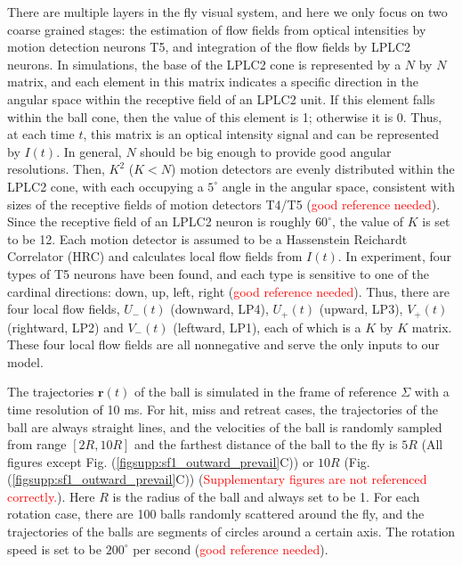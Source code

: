 There are multiple layers in the fly visual system, and here we only focus on two coarse grained stages: the estimation of flow fields from optical intensities by motion detection neurons T5, and integration of the flow fields by LPLC2 neurons. In simulations, the base of the LPLC2 cone is represented by a $N$ by $N$ matrix, and each element in this matrix indicates a specific direction in the angular space within the receptive field of an LPLC2 unit. If this element falls within the ball cone, then the value of this element is 1; otherwise it is 0. Thus, at each time $t$, this matrix is an optical intensity signal and can be represented by $I(t)$. In general, $N$ should be big enough to provide good angular resolutions. Then, $K^{2}$ ($K<N$) motion detectors are evenly distributed within the LPLC2 cone, with each occupying a $5^{\circ}$ angle in the angular space, consistent with sizes of the receptive fields of motion detectors T4/T5 (\textcolor{red}{good reference needed}). Since the receptive field of an LPLC2 neuron is roughly $60^{\circ}$, the value of $K$ is set to be 12. Each motion detector is assumed to be a Hassenstein Reichardt Correlator (HRC) and calculates local flow fields from $I(t)$. In experiment, four types of T5 neurons have been found, and each type is sensitive to one of the cardinal directions: down, up, left, right (\textcolor{red}{good reference needed}). Thus, there are four local flow fields, $U_{-}(t)$ (downward, LP4), $U_{+}(t)$ (upward, LP3), $V_{+}(t)$ (rightward, LP2) and $V_{-}(t)$ (leftward, LP1), each of which is a $K$ by $K$ matrix. These four local flow fields are all nonnegative and serve the only inputs to our model.

The trajectories $\mathbf{r}(t)$ of the ball is simulated in the frame of reference $\Sigma$ with a time resolution of 10 ms. For hit, miss and retreat cases, the trajectories of the ball are always straight lines, and the velocities of the ball is randomly sampled from range $[2R,10R]$ and the farthest distance of the ball to the fly is $5R$ (All figures except Fig. (\ref{figsupp:sf1_outward_prevail}C)) or $10R$ (Fig. (\ref{figsupp:sf1_outward_prevail}C)) (\textcolor{red}{Supplementary figures are not referenced correctly.}). Here $R$ is the radius of the ball and always set to be 1. For each rotation case, there are 100 balls randomly scattered around the fly, and the trajectories of the balls are segments of circles around a certain axis. The rotation speed is set to be $200^{\circ}$ per second (\textcolor{red}{good reference needed}).

